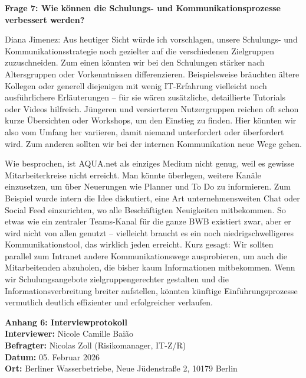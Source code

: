 \documentclass[
    12pt, 
    a4paper,
    ]{scrartcl} %
\begin{document}
\textbf{Frage 7: Wie können die Schulungs- und Kommunikationsprozesse verbessert werden?}

Diana Jimenez: Aus heutiger Sicht würde ich vorschlagen, unsere Schulungs- und Kommunikationsstrategie noch gezielter auf die verschiedenen Zielgruppen zuzuschneiden. Zum einen könnten wir bei den Schulungen stärker nach Altersgruppen oder Vorkenntnissen differenzieren. Beispielsweise bräuchten ältere Kollegen oder generell diejenigen mit wenig IT-Erfahrung vielleicht noch ausführlichere Erläuterungen – für sie wären zusätzliche, detaillierte Tutorials oder Videos hilfreich. Jüngeren und versierteren Nutzergruppen reichen oft schon kurze Übersichten oder Workshops, um den Einstieg zu finden. Hier könnten wir also vom Umfang her variieren, damit niemand unterfordert oder überfordert wird. Zum anderen sollten wir bei der internen Kommunikation neue Wege gehen. 

Wie besprochen, ist AQUA.net als einziges Medium nicht genug, weil es gewisse Mitarbeiterkreise nicht erreicht. Man könnte überlegen, weitere Kanäle einzusetzen, um über Neuerungen wie Planner und To Do zu informieren. Zum Beispiel wurde intern die Idee diskutiert, eine Art unternehmensweiten Chat oder Social Feed einzurichten, wo alle Beschäftigten Neuigkeiten mitbekommen. So etwas wie ein zentraler Teams-Kanal für die ganze BWB existiert zwar, aber er wird nicht von allen genutzt – vielleicht braucht es ein noch niedrigschwelligeres Kommunikationstool, das wirklich jeden erreicht. Kurz gesagt: Wir sollten parallel zum Intranet andere Kommunikationswege ausprobieren, um auch die Mitarbeitenden abzuholen, die bisher kaum Informationen mitbekommen. Wenn wir Schulungsangebote zielgruppengerechter gestalten und die Informationsverbreitung breiter aufstellen, könnten künftige Einführungsprozesse vermutlich deutlich effizienter und erfolgreicher verlaufen.

\newpage
{}
{}
\label{sec:Anhang6}

{\Large\bfseries Anhang 6: Interviewprotokoll}\\[1em]
\textbf{Interviewer:} Nicole Camille Baião \\
\textbf{Befragter:} Nicolas Zoll (Risikomanager, IT-Z/R) \\
\textbf{Datum:} 05. Februar 2026 \\
\textbf{Ort:} Berliner Wasserbetriebe, Neue Jüdenstraße 2, 10179 Berlin \\
\end{document}
